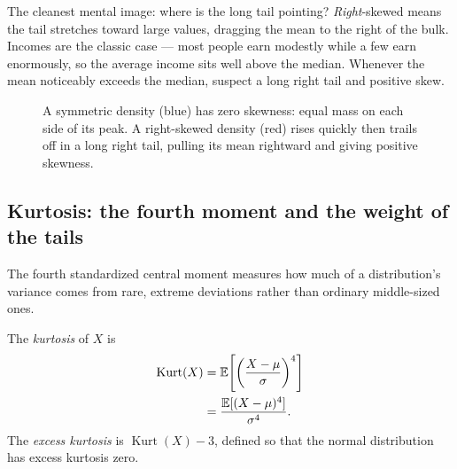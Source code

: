 \begin{intuitionbox}
The cleanest mental image: where is the long tail pointing? \emph{Right}-skewed
means the tail stretches toward large values, dragging the mean to the right
of the bulk. Incomes are the classic case --- most people earn modestly while
a few earn enormously, so the average income sits well above the median.
Whenever the mean noticeably exceeds the median, suspect a long right tail and
positive skew.
\end{intuitionbox}

\begin{figure}[H]
\centering
{}
\caption{A symmetric density (blue) has zero skewness: equal mass on each
side of its peak. A right-skewed density (red) rises quickly then trails off
in a long right tail, pulling its mean rightward and giving positive
skewness.}
\label{ch09:fig-skew}
\end{figure}

\subsection{Kurtosis: the fourth moment and the weight of the tails}

The fourth standardized central moment measures how much of a distribution's
variance comes from rare, extreme deviations rather than ordinary
middle-sized ones.

\begin{definition}[Kurtosis]
\label{ch09:def-kurt}
The \emph{kurtosis} of $X$ is
\begin{align*}
  \operatorname{Kurt}(X) &= \operatorname{\mathbb{E}}\!\left[\left(\frac{X-\mu}{\sigma}\right)^{4}\right] \\
  &= \frac{\operatorname{\mathbb{E}}[(X-\mu)^4]}{\sigma^4}.
\end{align*}
The \emph{excess kurtosis} is $\operatorname{Kurt}(X) - 3$, defined so that the
normal distribution has excess kurtosis zero.
\end{definition}

